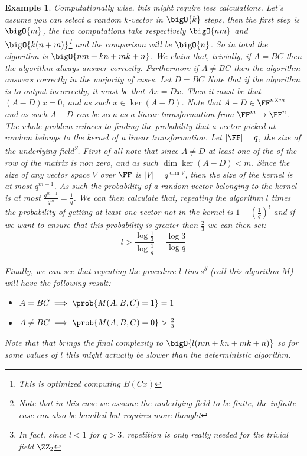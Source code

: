 \documentclass{article}
\newtheorem{example}{Example}
\begin{document}
\begin{example}
    Computationally wise, this might require less calculations. Let's assume you can select a random $k$-vector in $\bigO{k}$ steps, then the first step is $\bigO{m}$, the two computations take respectively $\bigO{nm}$ and $\bigO{k (n + m)}$\footnote{This is optimized computing $B(Cx)$} and the comparison will be $\bigO{n}$. So in total the algorithm is $\bigO{nm + kn + mk + n}$. We claim that, trivially, if $A = BC$ then the algorithm always answer correctly. Furthermore if $A \neq BC$ then the algorithm answers correctly in the majority of cases. Let $D = BC$ Note that if the algorithm is to output incorrectly, it must be that $Ax = Dx$. Then it must be that $(A - D) x = 0$, and as such $x \in \ker(A - D)$. Note that $A - D \in \FF^{n \times m}$ and as such $A - D$ can be seen as a linear transformation from $\FF^m \to \FF^n$. The whole problem reduces to finding the probability that a vector picked at random belongs to the kernel of a linear transformation. Let $|\FF| = q$, the size of the underlying field\footnote{Note that in this case we assume the underlying field to be finite, the infinite case can also be handled but requires more thought}. First of all note that since $A \neq D$ at least one of the of the row of the matrix is non zero, and as such $\dim \ker (A - D) < m$. Since the size of any vector space $V$ over $\FF$ is $|V| = q^{\dim V}$, then the size of the kernel is at most $q^{m - 1}$. As such the probability of a random vector belonging to the kernel is at most $\frac{q^{m-1}}{q^m}=\frac{1}{q}$. We can then calculate that, repeating the algorithm $l$ times the probability of getting at least one vector not in the kernel is $1 - \left(\frac{1}{q}\right)^l$ and if we want to ensure that this probability is greater than $\frac{2}{3}$ we can then set:
    \[l > \frac{\log \frac{1}{3}}{\log \frac{1}{q}} = \frac{\log{3}}{\log{q}}\]

    Finally, we can see that repeating the procedure $l$ times\footnote{In fact, since $l < 1$ for $q > 3$, repetition is only really needed for the trivial field $\ZZ_2$} (call this algorithm $M$) will have the following result:
    \begin{itemize}
        \item $A = BC \implies \prob{M(A, B,C) = 1} = 1$
        \item $A \neq BC \implies \prob{M(A, B,C) = 0} > \frac{2}{3}$
    \end{itemize}

    Note that that brings the final complexity to $\bigO{l(nm + kn + mk + n)}$ so for some values of $l$ this might actually be slower than the deterministic algorithm.

\end{example}
\end{document}
